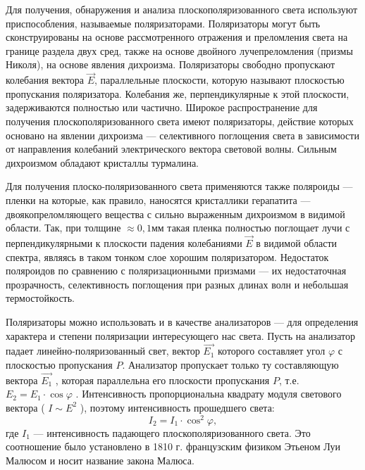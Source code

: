 \documentclass[12pt]{article}
\begin{document}
    Для получения, обнаружения и анализа плоскополяризованного света используют приспособления, называемые поляризаторами. Поляризаторы могут быть сконструированы на основе рассмотренного отражения и преломления света на границе раздела двух сред, также на основе двойного лучепреломления (призмы Николя), на основе явления дихроизма. Поляризаторы свободно пропускают колебания вектора $ \vec{E} $, параллельные плоскости, которую называют плоскостью пропускания поляризатора. Колебания же, перпендикулярные к этой плоскости, задерживаются полностью или частично. Широкое распространение для получения плоскополяризованного света имеют поляризаторы, действие которых основано на явлении дихроизма --- селективного поглощения света в зависимости от направления колебаний электрического вектора световой волны. Сильным дихроизмом обладают кристаллы турмалина.

    Для получения плоско-поляризованного света применяются также поляроиды --- пленки на которые, как правило, наносятся кристаллики герапатита --- двоякопреломляющего вещества с сильно выраженным дихроизмом в видимой области. Так, при толщине $ \approx 0,1 мм $ такая пленка полностью поглощает лучи с перпендикулярными к плоскости падения колебаниями $ \vec{E} $  в видимой области спектра, являясь в таком тонком слое хорошим поляризатором. Недостаток поляроидов по сравнению с поляризационными призмами --- их недостаточная прозрачность, селективность поглощения при разных длинах волн и небольшая термостойкость.

    Поляризаторы можно  использовать и в качестве анализаторов --- для определения характера и степени поляризации интересующего нас света. Пусть на анализатор падает линейно-поляризованный свет, вектор $ \vec{E_1} $  которого составляет угол $ \varphi $  с плоскостью пропускания $ P $. Анализатор пропускает только ту составляющую вектора $ \vec{E_1} $ , которая параллельна его плоскости пропускания $ P $, т.е. $ E_2 = E_1 \cdot \cos{\varphi} $ . Интенсивность пропорциональна квадрату модуля светового вектора ( $ I \sim E^2 $ ), поэтому интенсивность прошедшего света:
    \begin{equation}
        \label{eq:in}
        I_2 = I_1 \cdot \cos^2{\varphi},
    \end{equation}
    где $ I_1 $ --- интенсивность падающего плоскополяризованного света. Это соотношение было установлено в 1810 г. французским физиком Этьеном Луи Малюсом и носит название закона Малюса.
    \newpage
\end{document}
